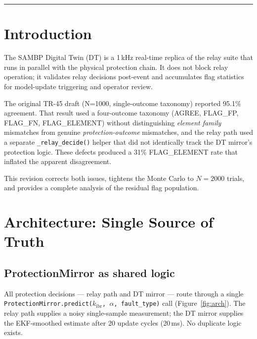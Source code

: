 \documentclass[11pt,a4paper]{article}
\newcommand{\kibr}{k_\mathrm{ibr}}
\begin{document}
\vspace{4pt}\hrule\vspace{10pt}

\section{Introduction}
\label{sec:intro}

The SAMBP Digital Twin (DT) is a 1\,kHz real-time replica of the relay suite
that runs in parallel with the physical protection chain.  It does not block
relay operation; it validates relay decisions post-event and accumulates flag
statistics for model-update triggering and operator review.

The original TR-45 draft (N=1000, single-outcome taxonomy) reported 95.1\%
agreement.  That result used a four-outcome taxonomy (AGREE, FLAG\_FP,
FLAG\_FN, FLAG\_ELEMENT) without distinguishing \emph{element family}
mismatches from genuine \emph{protection-outcome} mismatches, and the relay
path used a separate \texttt{\_relay\_decide()} helper that did not
identically track the DT mirror's protection logic.  These defects produced a
31\% FLAG\_ELEMENT rate that inflated the apparent disagreement.

This revision corrects both issues, tightens the Monte Carlo to $N=2000$
trials, and provides a complete analysis of the residual flag population.

\section{Architecture: Single Source of Truth}
\label{sec:arch}

\subsection{ProtectionMirror as shared logic}

All protection decisions — relay path and DT mirror — route through a single
\texttt{ProtectionMirror.predict($\kibr$, $\alpha$, fault\_type)} call
(Figure~\ref{fig:arch}).  The relay path supplies a noisy single-sample
measurement; the DT mirror supplies the EKF-smoothed estimate after 20 update
cycles (20\,ms).  No duplicate logic exists.
\end{document}
